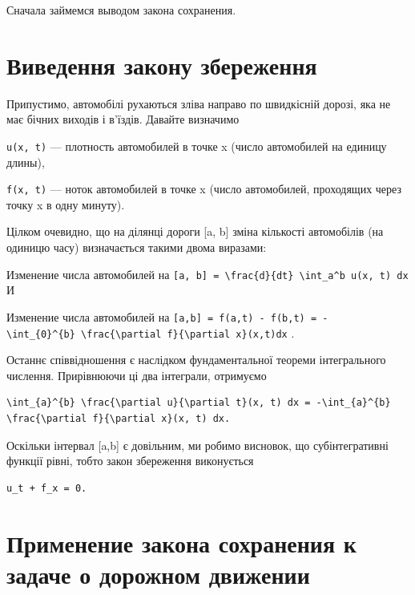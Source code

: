\documentclass[
  ukrainian,
]{article}
\begin{document}
Сначала займемся выводом закона сохранения.

\section{Виведення закону
збереження}\label{ux432ux438ux432ux435ux434ux435ux43dux43dux44f-ux437ux430ux43aux43eux43dux443-ux437ux431ux435ux440ux435ux436ux435ux43dux43dux44f}

Припустимо, автомобілі рухаються зліва направо по швидкісній дорозі, яка
не має бічних виходів і в'їздів. Давайте визначимо

\texttt{u(x,\ t)} --- плотность автомобилей в точке x (число автомобилей
на единицу длины),

\texttt{f(x,\ t)} --- ноток автомобилей в точке x (число автомобилей,
проходящих через точку x в одну минуту).

Цілком очевидно, що на ділянці дороги {[}a, b{]} зміна кількості
автомобілів (на одиницю часу) визначається такими двома виразами:

Изменение числа автомобилей на
\texttt{{[}a,\ b{]}\ =\ \textbackslash{}frac\{d\}\{dt\}\ \textbackslash{}int\_a\^{}b\ u(x,\ t)\ dx}
И

Изменение числа автомобилей на
\texttt{{[}a,b{]}\ =\ f(a,t)\ -\ f(b,t)\ =\ -\textbackslash{}int\_\{0\}\^{}\{b\}\ \textbackslash{}frac\{\textbackslash{}partial\ f\}\{\textbackslash{}partial\ x\}(x,t)dx}
.

Останнє співвідношення є наслідком фундаментальної теореми інтегрального
числення. Прирівнюючи ці два інтеграли, отримуємо

\begin{verbatim}
\int_{a}^{b} \frac{\partial u}{\partial t}(x, t) dx = -\int_{a}^{b} \frac{\partial f}{\partial x}(x, t) dx.
\end{verbatim}

Оскільки інтервал {[}a,b{]} є довільним, ми робимо висновок, що
субінтегративні функції рівні, тобто закон збереження виконується

\begin{verbatim}
u_t + f_x = 0.
\end{verbatim}

\section{Применение закона сохранения к задаче о дорожном
движении}\label{ux43fux440ux438ux43cux435ux43dux435ux43dux438ux435-ux437ux430ux43aux43eux43dux430-ux441ux43eux445ux440ux430ux43dux435ux43dux438ux44f-ux43a-ux437ux430ux434ux430ux447ux435-ux43e-ux434ux43eux440ux43eux436ux43dux43eux43c-ux434ux432ux438ux436ux435ux43dux438ux438}
\end{document}

